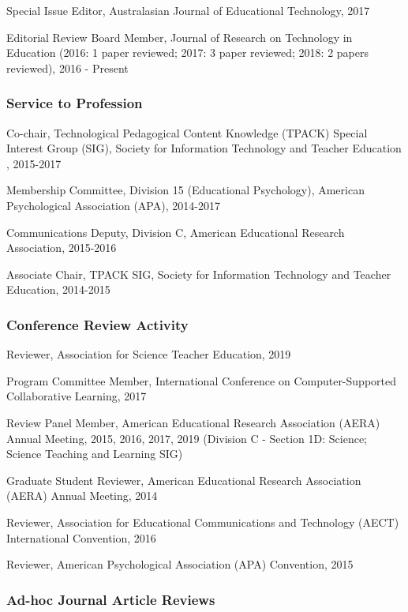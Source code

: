 \documentclass[]{article}
\begin{document}
Special Issue Editor, Australasian Journal of Educational Technology,
2017

Editorial Review Board Member, Journal of Research on Technology in
Education (2016: 1 paper reviewed; 2017: 3 paper reviewed; 2018: 2
papers reviewed), 2016 - Present

\hypertarget{service-to-profession}{%
\subsubsection{Service to Profession}\label{service-to-profession}}

Co-chair, Technological Pedagogical Content Knowledge (TPACK) Special
Interest Group (SIG), Society for Information Technology and Teacher
Education , 2015-2017

Membership Committee, Division 15 (Educational Psychology), American
Psychological Association (APA), 2014-2017

Communications Deputy, Division C, American Educational Research
Association, 2015-2016

Associate Chair, TPACK SIG, Society for Information Technology and
Teacher Education, 2014-2015

\hypertarget{conference-review-activity}{%
\subsubsection{Conference Review
Activity}\label{conference-review-activity}}

Reviewer, Association for Science Teacher Education, 2019

Program Committee Member, International Conference on Computer-Supported
Collaborative Learning, 2017

Review Panel Member, American Educational Research Association (AERA)
Annual Meeting, 2015, 2016, 2017, 2019 (Division C - Section 1D:
Science; Science Teaching and Learning SIG)

Graduate Student Reviewer, American Educational Research Association
(AERA) Annual Meeting, 2014

Reviewer, Association for Educational Communications and Technology
(AECT) International Convention, 2016

Reviewer, American Psychological Association (APA) Convention, 2015

\hypertarget{ad-hoc-journal-article-reviews}{%
\subsubsection{Ad-hoc Journal Article
Reviews}\label{ad-hoc-journal-article-reviews}}
\end{document}
